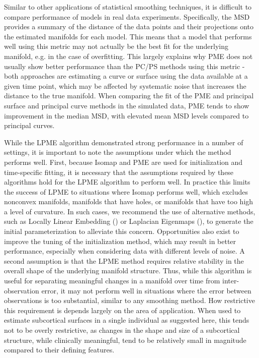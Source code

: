 \documentclass[11pt,reqno]{article}
\theoremstyle{definition}
\begin{document}
Similar to other applications of statistical smoothing techniques, it is difficult to compare performance of models in real data experiments. Specifically, the MSD provides a summary of the distance of the data points and their projections onto the estimated manifolds for each model. This means that a model that performs well using this metric may not actually be the best fit for the underlying manifold, e.g. in the case of overfitting. This largely explains why PME does not usually show better performance than the PC/PS methods using this metric - both approaches are estimating a curve or surface using the data available at a given time point, which may be affected by systematic noise that increases the distance to the true manifold. When comparing the fit of the PME and principal surface and principal curve methods in the simulated data, PME tends to show improvement in the median MSD, with elevated mean MSD levels compared to principal curves.

While the LPME algorithm demonstrated strong performance in a number of settings, it is important to note the assumptions under which the method performs well. First, because Isomap and PME are used for initialization and time-specific fitting, it is necessary that the assumptions required by these algorithms hold for the LPME algorithm to perform well. In practice this limits the success of LPME to situations where Isomap performs well, which excludes nonconvex manifolds, manifolds that have holes, or manifolds that have too high a level of curvature. In such cases, we recommend the use of alternative methods, such as Locally Linear Embedding (\cite{roweisNonlinearDimensionalityReduction2000}) or Laplacian Eigenmaps (\cite{belkin2003laplacian}), to generate the initial parameterization to alleviate this concern. Opportunities also exist to improve the tuning of the initialization method, which may result in better performance, especially when considering data with different levels of noise. A second assumption is that the LPME method requires relative stability in the overall shape of the underlying manifold structure. Thus, while this algorithm is useful for separating meaningful changes in a manifold over time from inter-observation error, it may not perform well in situations where the error between observations is too substantial, similar to any smoothing method. How restrictive this requirement is depends largely on the area of application. When used to estimate subcortical surfaces in a single individual as suggested here, this tends not to be overly restrictive, as changes in the shape and size of a subcortical structure, while clinically meaningful, tend to be relatively small in magnitude compared to their defining features.
\end{document}

